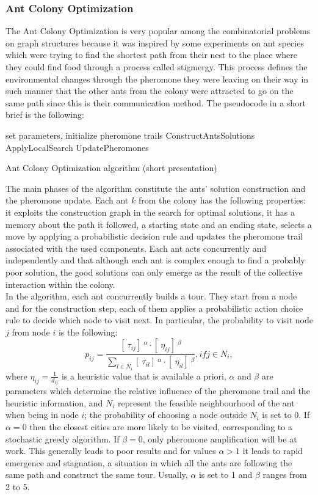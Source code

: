 \documentclass{article}
\begin{document}
\subsubsection{Ant Colony Optimization}
The Ant Colony Optimization is very popular among the combinatorial problems on graph structures because it was inspired by some experiments on ant species which were trying to find the shortest path from their nest to the place where they could find food through a process called stigmergy. This process defines the environmental changes through the pheromone they were leaving on their way in such manner that the other ants from the colony were attracted to go on the same path since this is their communication method.
The pseudocode in a short brief is the following:\\
\begin{algorithm}[H]
\SetAlgoLined
    set parameters, initialize pheromone trails\;
    {
        ConstructAntsSolutions\;
        ApplyLocalSearch\;
        UpdatePheromones\;
    }
 \caption{Ant Colony Optimization algorithm (short presentation)}
\end{algorithm}
The main phases of the algorithm constitute the ants' solution construction and the pheromone update. Each ant $k$ from the colony has the following properties: it exploits the construction graph in the search for optimal solutions, it has a memory about the path it followed, a starting state and an ending state, selects a move by applying a probabilistic decision rule and updates the pheromone trail associated with the used components. Each ant acts concurrently and independently and that although each ant is complex enough to find a probably poor solution, the good solutions can only emerge as the result of the collective interaction within the colony.\\
In the algorithm, each ant concurrently builds a tour. They start from a node and for the construction step, each of them applies a probabilistic action choice rule to decide which node to visit next. In particular, the probability to visit node $j$ from node $i$ is the following:
$$p_{ij} = \frac{[\ \tau_{ij} ] \ ^\alpha \cdot [\ \eta_{ij}]\ ^\beta}{\sum_{l \in N_i} [\ \tau_{il} ] \ ^\alpha \cdot [\ \eta_{il}]\ ^\beta}, if j \in N_i,$$
where $\eta_{ij} = \frac{1}{d_{ij}}$ is a heuristic value that is available a priori, $\alpha$ and $\beta$ are parameters which determine the relative influence of the pheromone trail and the heuristic information, and $N_i$ represent the feasible neighbourhood of the ant when being in node $i$; the probability of choosing a node outside $N_i$ is set to 0. If $\alpha = 0$ then the closest cities are more likely to be visited, corresponding to a stochastic greedy algorithm. If $\beta = 0$, only pheromone amplification will be at work. This generally leads to poor results and for values $\alpha > 1$ it leads to rapid emergence and stagnation, a situation in which all the ants are following the same path and construct the same tour. Usually, $\alpha$ is set to 1 and $\beta$ ranges from 2 to 5.\\
\end{document}
